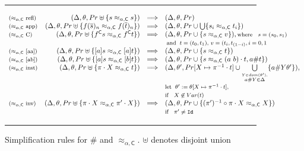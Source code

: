 \documentclass[11pt,a4paper]{amsart}
\newcommand{\caleq}{\approx_{\alpha,\theory{C}}}
\newcommand{\theory}[1]{\ensuremath{\mathsf{#1}}}
\theoremstyle{plain}
\theoremstyle{definition}
\theoremstyle{remark}
\begin{document}
\begin{figure}[!t]
\rule{15.3cm}{0.01cm}
{\small
    $$    
    \begin{array}{lrll}
        {\text{\footnotesize ($\caleq$ refl)}} & (\Delta, \theta, Pr \uplus \{s \caleq s \}) & \Longrightarrow & (\Delta, \theta, Pr)\\
        {\text{\footnotesize ($\caleq$ app)}} & (\Delta, \theta, Pr \uplus \{f(\overline{s})_n \caleq f(\overline{t})_n \}) & \Longrightarrow & (\Delta, \theta, Pr \cup \bigcup\{ s_i \caleq t_i \} )\\
        {\text{\footnotesize ($\caleq$ C)}} & (\Delta, \theta, Pr \uplus \{f^\theory{C} s \caleq f^\theory{C} t \}) & \Longrightarrow & (\Delta, \theta, Pr \cup \{ s \caleq v \}), {\text{\footnotesize where \; $s=(s_0,s_1)$}}\\
        &&& {\text{\footnotesize\;and\; $t=(t_0,t_1)$, $v=(t_i, t_{(1-i)} , i = 0,1$ }}\\
        {\text{\footnotesize ($\caleq$ [aa])}} & (\Delta, \theta, Pr \uplus \{[a]s \caleq [a]t \}) & \Longrightarrow & (\Delta, \theta, Pr \cup \{ s \caleq t \})\\
        {\text{\footnotesize ($\caleq$ [ab])}} & (\Delta, \theta, Pr \uplus \{[a]s \caleq [b]t \}) & \Longrightarrow & (\Delta, \theta, Pr \cup \{ s \caleq (a\ b)\cdot t, a \# t \})\\
        {\text{\footnotesize ($\caleq$ inst)}} & (\Delta, \theta, Pr \uplus \{ \pi \cdot X \caleq t \}) & \Longrightarrow & (\Delta, \theta', Pr[X\mapsto\pi^{-1}\cdot t] \cup \underset{\overset{Y \in dom(\theta'),}{a \# Y \in \Delta}}{\bigcup} \{a \# Y\theta' \}),\\
        & && {\text{\footnotesize let\; $\theta':= \theta[X \mapsto \pi^{-1} \cdot t]$,}}\\
        & && {\text{\footnotesize if \; $X \not\in Var(t)$} }\\
        {\text{\footnotesize ($\caleq$ inv)}} & (\Delta, \theta, Pr \uplus \{ \pi \cdot X \caleq \pi'\cdot X \}) & \Longrightarrow & (\Delta, \theta, Pr \cup \{ (\pi')^{-1} \circ \pi \cdot X \caleq X \})\;\\
        & & & {\text{\footnotesize if \; $\pi' \neq \texttt{Id}$}}\\
\end{array}
$$    
}
\rule{15.3cm}{0.01cm}
    \caption{Simplification rules for $\#$ and $\caleq$. $\uplus$ denotes disjoint union}
    \label{fig:freshness-and-equal-simp}
\end{figure}
\end{document}
